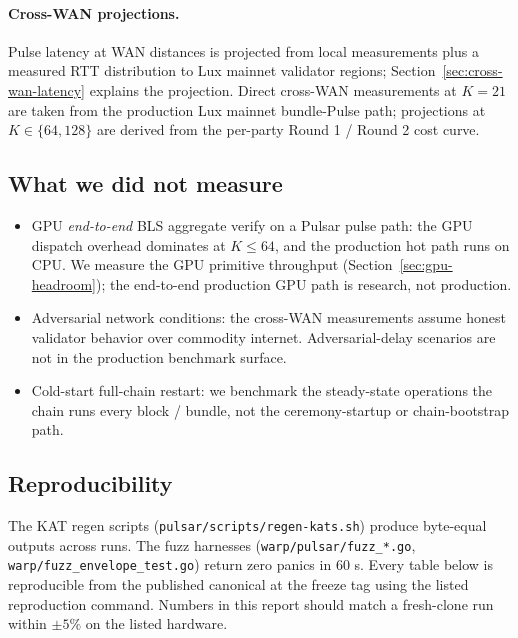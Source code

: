 \paragraph{Cross-WAN projections.} Pulse latency at WAN distances is projected from local measurements plus a measured RTT distribution to Lux mainnet validator regions; Section~\ref{sec:cross-wan-latency} explains the projection. Direct cross-WAN measurements at $K=21$ are taken from the production Lux mainnet bundle-Pulse path; projections at $K \in \{64, 128\}$ are derived from the per-party Round 1 / Round 2 cost curve.

\subsection{What we did not measure}

\begin{itemize}[leftmargin=2em,nosep]
  \item GPU \emph{end-to-end} BLS aggregate verify on a Pulsar pulse path: the GPU dispatch overhead dominates at $K \leq 64$, and the production hot path runs on CPU. We measure the GPU primitive throughput (Section~\ref{sec:gpu-headroom}); the end-to-end production GPU path is research, not production.
  \item Adversarial network conditions: the cross-WAN measurements assume honest validator behavior over commodity internet. Adversarial-delay scenarios are not in the production benchmark surface.
  \item Cold-start full-chain restart: we benchmark the steady-state operations the chain runs every block / bundle, not the ceremony-startup or chain-bootstrap path.
\end{itemize}

\subsection{Reproducibility}

The KAT regen scripts (\texttt{pulsar/scripts/regen-kats.sh}) produce byte-equal outputs across runs. The fuzz harnesses (\texttt{warp/pulsar/fuzz\_*.go}, \texttt{warp/fuzz\_envelope\_test.go}) return zero panics in 60 s. Every table below is reproducible from the published canonical at the freeze tag using the listed reproduction command. Numbers in this report should match a fresh-clone run within $\pm 5\%$ on the listed hardware.
